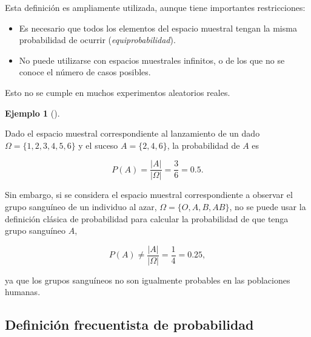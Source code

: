 \documentclass[
  spanish,
  a4paper,
]{scrreport}
\theoremstyle{plain}
\theoremstyle{definition}
\newtheorem{example}{Ejemplo}[chapter]
\theoremstyle{definition}
\theoremstyle{remark}
\begin{document}
Esta definición es ampliamente utilizada, aunque tiene importantes
restricciones:

\begin{itemize}
\item
  Es necesario que todos los elementos del espacio muestral tengan la
  misma probabilidad de ocurrir (\emph{equiprobabilidad}).
\item
  No puede utilizarse con espacios muestrales infinitos, o de los que no
  se conoce el número de casos posibles.
\end{itemize}

\begin{tcolorbox}[enhanced jigsaw, arc=.35mm, bottomrule=.15mm, bottomtitle=1mm, breakable, colback=white, colbacktitle=quarto-callout-caution-color!10!white, colframe=quarto-callout-caution-color-frame, coltitle=black, left=2mm, leftrule=.75mm, opacityback=0, opacitybacktitle=0.6, rightrule=.15mm, title=\textcolor{quarto-callout-caution-color}{\faFire}\hspace{0.5em}{Precaución}, titlerule=0mm, toprule=.15mm, toptitle=1mm]

Esto no se cumple en muchos experimentos aleatorios reales.

\end{tcolorbox}

\begin{example}[]\protect\hypertarget{exm-experimento-sin-equiprobabilidad}{}\label{exm-experimento-sin-equiprobabilidad}

Dado el espacio muestral correspondiente al lanzamiento de un dado
\(\Omega=\{1,2,3,4,5,6\}\) y el suceso \(A=\{2,4,6\}\), la probabilidad
de \(A\) es

\[P(A) = \frac{|A|}{|\Omega|} = \frac{3}{6} = 0.5.\]

Sin embargo, si se considera el espacio muestral correspondiente a
observar el grupo sanguíneo de un individuo al azar,
\(\Omega=\{O,A,B,AB\}\), no se puede usar la definición clásica de
probabilidad para calcular la probabilidad de que tenga grupo sanguíneo
\(A\),

\[P(A) \neq \frac{|A|}{|\Omega|} = \frac{1}{4} = 0.25,\]

ya que los grupos sanguíneos no son igualmente probables en las
poblaciones humanas.

\end{example}

\subsection{Definición frecuentista de
probabilidad}\label{definiciuxf3n-frecuentista-de-probabilidad}
\end{document}
